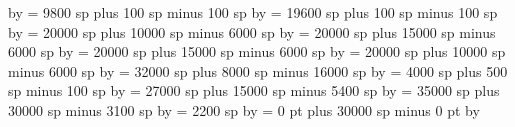 {\multiply\punctuminclinatumdebilisshift by \grefactor %
%
\punctuminclinatumbigshift= 9800 sp plus 100 sp minus 100 sp%
\multiply\punctuminclinatumbigshift by \grefactor%
%
\punctuminclinatummaxshift= 19600 sp plus 100 sp minus 100 sp%
\multiply\punctuminclinatummaxshift by \grefactor%
%
\spacearoundsmallbar = 20000 sp plus 10000 sp minus 6000 sp%
\multiply\spacearoundsmallbar by \grefactor %
%
\spacearoundminor = 20000 sp plus 15000 sp minus 6000 sp%
\multiply\spacearoundminor by \grefactor %
%
\spacearoundmaior = 20000 sp plus 15000 sp minus 6000 sp%
\multiply\spacearoundmaior by \grefactor %
%
\spacearoundfinalis = 20000 sp plus 10000 sp minus 6000 sp%
\multiply\spacearoundfinalis by \grefactor %
%
\spacebeforefinalfinalis= 32000 sp plus 8000 sp minus 16000 sp%
\multiply\spacebeforefinalfinalis by \grefactor %
%
\spacearoundclefbars= 4000 sp plus 500 sp minus 100 sp%
\multiply\spacearoundclefbars by \grefactor %
%
\textbartextspace = 27000 sp plus 15000 sp minus 5400 sp%
\multiply\textbartextspace by \grefactor %
%
\notebarspace = 35000 sp plus 30000 sp minus 3100 sp%
\multiply\notebarspace by \grefactor %
%
\maximumspacewithoutdash = 2200 sp%
\multiply\maximumspacewithoutdash by \grefactor %
%
\afterclefnospace = 0 pt plus 30000 sp minus 0 pt%
\multiply\afterclefnospace by \grefactor %
\relax %
}
